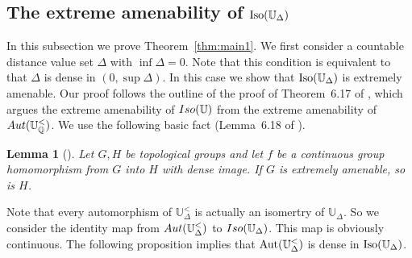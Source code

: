 \documentclass{amsart}
\newtheorem{lemma}[theorem]{Lemma}
\theoremstyle{definition}
\theoremstyle{remark}
\begin{document}
\subsection{The extreme amenability of $\mbox{\rm Iso}(\mathbb{U}_\Delta)$} In this subsection we prove Theorem~\ref{thm:main1}. We first consider a countable distance value set $\Delta$ with $\inf\Delta=0$. Note that this condition is equivalent to that $\Delta$ is dense in $(0,\sup \Delta)$. In this case we show that $\mbox{\rm Iso}(\mathbb{U}_\Delta)$ is extremely amenable. 
Our proof follows the outline of the proof of Theorem~6.17 of \cite{KPT}, which argues the extreme amenability of ${\rm Iso}(\mathbb{U})$ from the extreme amenability of ${\rm Aut}(\mathbb{U}_\mathbb{Q}^<)$. We use the following basic fact (Lemma~6.18 of \cite{KPT}).

    \begin{lemma}[\cite{KPT}]\label{lem:denseimage}
        Let $G,H$ be topological groups and let $f$ be a continuous group homomorphism from $G$ into $H$ with dense image. If $G$ is extremely amenable, so is $H$. 
    \end{lemma}

    Note that every automorphism of $\mathbb{U}_\Delta^<$ is actually an isomertry of $\mathbb{U}_\Delta$. So we consider the identity map from ${\rm Aut}(\mathbb{U}_\Delta^<)$ to ${\rm Iso}(\mathbb{U}_\Delta)$. This map is obviously continuous. The following proposition implies that $\mbox{\rm Aut}(\mathbb{U}^<_\Delta)$ is dense in $\mbox{\rm Iso}(\mathbb{U}_\Delta)$. %
   
\end{document}
